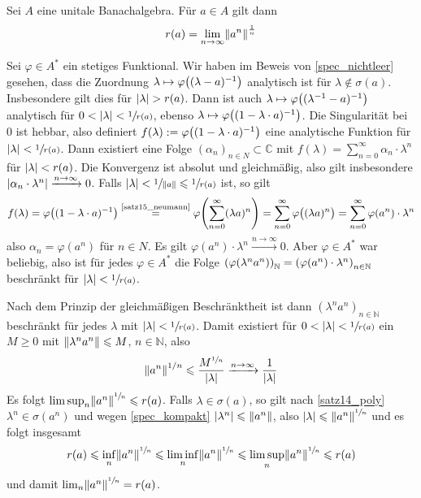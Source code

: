 \begin{satz}
	Sei $A$ eine unitale Banachalgebra. Für $a \in A$ gilt dann 
	\[
		r(a)=\lim_{n \to \infty}\norm{a^n}^{\frac{1}{n}}
	\]
\end{satz}
\begin{beweis}
	Sei $\varphi \in A^*$ ein stetiges Funktional. Wir haben im Beweis von \autoref{spec_nichtleer} gesehen, dass die Zuordnung 
	$\lambda \mapsto \varphi \enbrace*{(\lambda-a)^{-1}}$ analytisch ist für $\lambda \notin \sigma(a)$. Insbesondere gilt dies für $\abs{\lambda}> r(a)$. Dann ist auch
	$\lambda \mapsto \varphi \enbrace*{(\lambda^{-1}-a)^{-1}}$ analytisch für $0< \abs{\lambda}< \sfrac{1}{r(a)}$, ebenso 
	$\lambda \mapsto \varphi \enbrace*{(1- \lambda \cdot a)^{-1}}$. Die Singularität bei $0$ ist hebbar, also definiert $f(\lambda) := \varphi \enbrace*{(1-\lambda \cdot a)^{-1}}$
	eine analytische Funktion für $\abs{\lambda} < \sfrac{1}{r(a)}$. Dann existiert eine Folge $(\alpha_n)_{n \in N} \subset \mathbb{C}$ mit 
	$f(\lambda) = \sum_{n=0}^{\infty} \alpha_n \cdot \lambda^n$ für $\abs{\lambda}<r(a)$. Die Konvergenz ist absolut und gleichmäßig, also gilt insbesondere 
	$\abs{\alpha_n \cdot \lambda^n} \xrightarrow{n \to \infty}0$. Falls $\abs{\lambda} < \sfrac{1}{\norm{a}} \le \sfrac{1}{r(a)}$ 
	ist, so gilt
	\[
		f(\lambda) = \varphi \enbrace*{(1- \lambda \cdot a)^{-1}} \stackrel{\mbox{\scriptsize\ref{satz15_neumann}}}{=} \varphi \enbrace*{\sum_{n=0}^{\infty} (\lambda a)^n} = 
		\sum_{n=0}^{\infty} \varphi \enbrace[\big]{(\lambda a)^n} = \sum_{n=0}^{\infty} \varphi(a^n) \cdot \lambda^n
	\]
	also $\alpha_n = \varphi(a^n)$ für $n \in N$. Es gilt $\varphi(a^n) \cdot \lambda^n \xrightarrow{n \to \infty} 0$. Aber $\varphi \in A^*$ war beliebig, also ist für jedes 
	$\varphi \in A^*$ die Folge $\enbrace*{\varphi(\lambda^n a^n)}_\mathbb{N} = \enbrace*{\varphi(a^n) \cdot \lambda^n}_{n \in \mathbb{N}}$ beschränkt für 
	$\abs{\lambda}<\sfrac{1}{r(a)}$.

	Nach dem Prinzip der gleichmäßigen Beschränktheit ist dann $(\lambda^n a^n)_{n \in \mathbb{N}}$ beschränkt für jedes $\lambda$ mit $\abs{\lambda}< \sfrac{1}{r(a)}$. Damit 
	existiert für $0 < \abs{\lambda}< \sfrac{1}{r(a)}$ ein $M \ge 0$ mit $\norm{\lambda^n a^n} \le M$, $n \in \mathbb{N}$, also 
	\[
		\norm{a^n}^{1/n}\le\frac{M^{\sfrac{1}{n}}}{\abs{\lambda}} \xrightarrow{n \to \infty} \frac{1}{\abs{\lambda}} 
	\]
	Es folgt $\limsup_n \norm{a^n}^{\sfrac{1}{n}} \le r(a)$. Falls $\lambda \in \sigma(a)$, so gilt nach \autoref{satz14_poly} $\lambda^n \in \sigma(a^n)$ und wegen 
	\autoref{spec_kompakt} $\abs{\lambda^n} \le \norm{a^n}$, also $\abs{\lambda} \le \norm{a^n}^{\sfrac{1}{n}}$ und es folgt insgesamt
	\begin{align}
		r(a) \le \inf_n \norm{a^n}^{\sfrac{1}{n}} \le \liminf_n \norm{a^n}^{\sfrac{1}{n}} \le \limsup_n \norm{a^n}^{\sfrac{1}{n}} \le r(a)
	\end{align}
	und damit $\lim_n \norm{a^n}^{\sfrac{1}{n}} = r(a)$.
\end{beweis}

